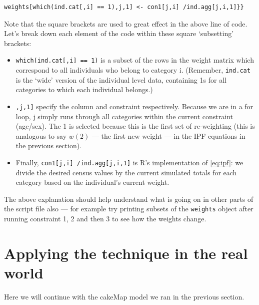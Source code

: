 \documentclass[a4paper, 11pt, twoside]{article}
\begin{document}
\begin{lstlisting}[float=h, caption={Saving the new weights after the first
constraint of IPF --- see line 43 in cMap.R}]
weights[which(ind.cat[,i] == 1),j,1] <- con1[j,i] /ind.agg[j,i,1]}}
\end{lstlisting}

Note that the square brackets are used to great effect in the above line of code.
Let's break down each element of the code within these square `subsetting' brackets:
\begin{itemize}
 \item \texttt{which(ind.cat[,i] == 1)} is a subset of the rows in the weight matrix
 which correspond to all individuals who belong to category i. (Remember,
 \texttt{ind.cat} is the `wide' version of the individual level data, containing
 1s for all categories to which each individual belongs.)
 \item \texttt{,j,1]} specify the column and constraint respectively.
 Because we are in a for loop, j simply runs through all categories within the
 current constraint (age/sex). The 1 is selected because this is the first set of
 re-weighting (this is analogous to say $w(2)$ --- the first new weight ---
 in the IPF equations in the previous section).
 \item Finally, \texttt{con1[j,i] /ind.agg[j,i,1]} is R's implementation of
 \cref{eq:ipf}: we divide the desired census values by the current simulated
 totals for each category based on the individual's current weight.
\end{itemize}

The above explanation should help understand what is going on in other
parts of the script file also --- for example try printing subsets of
the \texttt{weights} object after running constraint 1, 2 and then 3 to
see how the weights change.


\section{Applying the technique in the real world} \label{smeval}
Here we will continue with the cakeMap model we ran in the previous section.
\end{document}
